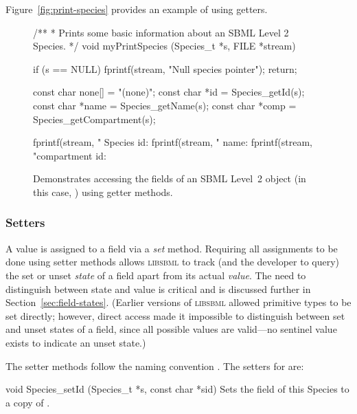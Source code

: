 \documentclass{sbmlmanual}
\newcommand{\libsbml}{\textsc{libsbml}}
\begin{document}
Figure~\vref{fig:print-species} provides an example of using getters. 

\begin{figure}[thb]
  \begin{codeVerbatim}[C,flexiblecolumns=false]
/** 
 * Prints some basic information about an SBML Level 2 Species.
 */
void
myPrintSpecies (Species_t *s, FILE *stream)
{
  if (s == NULL)
  {
    fprintf(stream, "Null species pointer\n");
    return;
  }

  const char none[] = "(none)";
  const char *id = Species_getId(s);
  const char *name = Species_getName(s);
  const char *comp = Species_getCompartment(s);

  fprintf(stream, "    Species id: %
  fprintf(stream, "          name: %
  fprintf(stream, "compartment id: %
}
  \end{codeVerbatim}
  \caption{Demonstrates accessing the fields of an SBML Level~2 object
  (in this case, ) using getter methods.}
  \label{fig:print-species}
\end{figure}


\subsubsection{Setters}

A value is assigned to a field via a \emph{set} method.  Requiring all
assignments to be done using setter methods allows \libsbml{} to track (and
the developer to query) the set or unset \emph{state} of a field apart from
its actual \emph{value}.  The need to distinguish between state and value
is critical and is discussed further in Section~\ref{sec:field-states}.
(Earlier versions of \libsbml{} allowed primitive types to be set directly;
however, direct access made it impossible to distinguish between set and
unset states of a field, since all possible values are valid---no sentinel
value exists to indicate an unset state.)

The setter methods follow the naming convention .
The setters for  are:


\begin{methoddef}{void Species\_setId (Species\_t *s, const char *sid)}
  Sets the  field of this Species to a copy of .
\end{methoddef}
\end{document}
